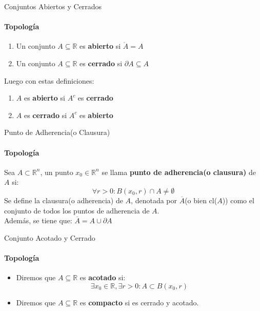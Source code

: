\documentclass{plantillaPPT}
\begin{document}
\begin{frame}{Conjuntos Abiertos y Cerrados}
\framesubtitle{Topología}

\begin{definicion}
    \begin{enumerate}
        \item Un conjunto \(A\subseteq\mathbb{R}\) es \textbf{abierto} si \(\mathring{A}=A\)
        \item Un conjunto \(A\subseteq\mathbb{R}\) es \textbf{cerrado} si \(\partial A\subseteq A\)
    \end{enumerate}
    \vspace{3ex}
    Luego con estas definiciones:
    \begin{enumerate}
        \item \(A\) es \textbf{abierto} si \(A^c\) es \textbf{cerrado}
        \item \(A\) es \textbf{cerrado} si \(A^c\) es \textbf{abierto}
    \end{enumerate}
\end{definicion}
\end{frame}

\begin{frame}{Punto de Adherencia(o Clausura)}
\framesubtitle{Topología}

\begin{definicion}
    Sea \(A\subset\mathbb{R}^n\), un punto \(x_0\in \mathbb{R}^n\) se llama \textbf{punto de adherencia(o clausura)} de \(A\) si:
    \[\forall r>0: B(x_0,r)\cap A\neq \emptyset\]
    Se define la clausura(o adherencia) de \(A\), denotada por \(\overline{A}\)(o bien cl(\(A\))) como el conjunto de todos los puntos de adherencia de \(A\). \\[15pt]
    Además, se tiene que: \(\overline{A} = A \cup \partial A\) 
\end{definicion}

\end{frame}

\begin{frame}{Conjunto Acotado y Cerrado}
\framesubtitle{Topología}

\begin{definicion}
\begin{itemize}
    \item Diremos que \(A \subseteq\mathbb{R}\) es \textbf{acotado} si:
    \[\exists x_0\in\mathbb{R},\exists r>0: A\subset B(x_0,r)\]
    \item Diremos que \(A \subseteq\mathbb{R}\) es \textbf{compacto} si es cerrado y acotado.
\end{itemize}
\end{definicion}

\end{frame}
\end{document}
